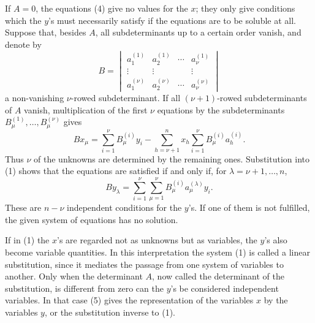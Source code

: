 \documentclass[11pt]{article}
\begin{document}
If \(A=0\), the equations (4) give no values for the \(x\); they only give conditions which the \(y\)'s must necessarily satisfy if the equations are to be soluble at all.  Suppose that, besides \(A\), all subdeterminants up to a certain order vanish, and denote by
\begin{equation}
        B=\begin{vmatrix}
        a_1^{(1)}&a_2^{(1)}&\cdots&a_\nu^{(1)}\\
        \vdots&\vdots&&\vdots\\
        a_1^{(\nu)}&a_2^{(\nu)}&\cdots&a_\nu^{(\nu)}
        \end{vmatrix}
\tag{6}
\end{equation}
a non-vanishing \(\nu\)-rowed subdeterminant.  If all \((\nu+1)\)-rowed subdeterminants of \(A\) vanish, multiplication of the first \(\nu\) equations by the subdeterminants \(B_\mu^{(1)},\ldots,B_\mu^{(\nu)}\) gives
\begin{equation}
        Bx_\mu=\sum_{i=1}^{\nu}B_\mu^{(i)}y_i
        -\sum_{h=\nu+1}^{n}x_h\sum_{i=1}^{\nu}B_\mu^{(i)}a_h^{(i)}.
\tag{7}
\end{equation}
Thus \(\nu\) of the unknowns are determined by the remaining ones.  Substitution into (1) shows that the equations are satisfied if and only if, for \(\lambda=\nu+1,
\ldots,n\),
\begin{equation}
        B y_\lambda=\sum_{i=1}^{\nu}\sum_{\mu=1}^{\nu}
        B_\mu^{(i)}a_\mu^{(\lambda)}y_i.
\tag{10}
\end{equation}
These are \(n-\nu\) independent conditions for the \(y\)'s.  If one of them is not fulfilled, the given system of equations has no solution.

If in (1) the \(x\)'s are regarded not as unknowns but as variables, the \(y\)'s also become variable quantities.  In this interpretation the system (1) is called a linear substitution, since it mediates the passage from one system of variables to another.  Only when the determinant \(A\), now called the determinant of the substitution, is different from zero can the \(y\)'s be considered independent variables.  In that case (5) gives the representation of the variables \(x\) by the variables \(y\), or the substitution inverse to (1).
\end{document}
